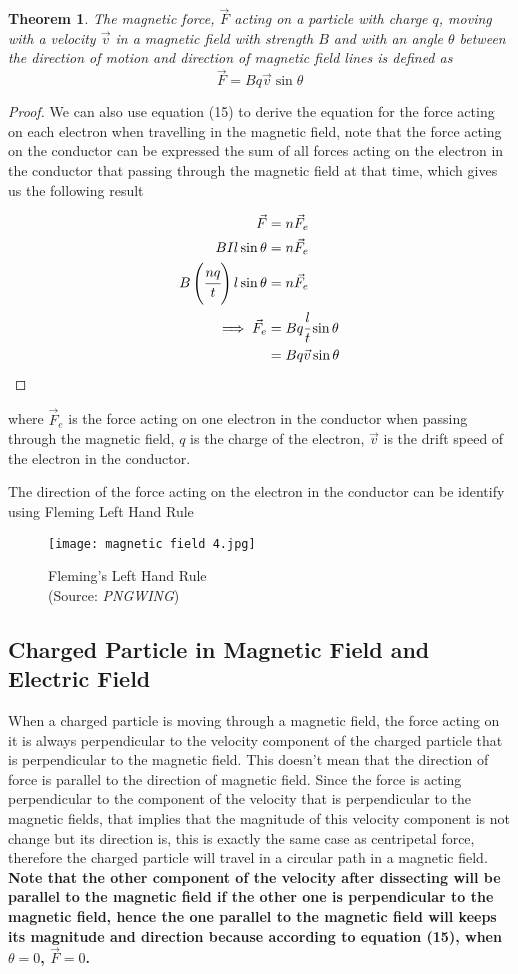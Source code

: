 \documentclass{article}
\newtheorem{theorem}{Theorem}[subsection]
\begin{document}
\begin{theorem}
The magnetic force, $\vec{F}$ acting on a particle with charge $q$, moving with a velocity $\vec{v}$ in a magnetic field with strength $B$ and with an angle $\theta$ between the direction of motion and direction of magnetic field lines is defined as
$$\vec{F}=Bq\vec{v}\sin \theta$$
\end{theorem}
\begin{proof}
We can also use equation (15) to derive the equation for the force acting on each electron when travelling in the magnetic field, note that the force acting on the conductor can be expressed the sum of all forces acting on the electron in the conductor that passing through the magnetic field at that time, which gives us the following result

\begin{align*}
    \vec{F}&=n\vec{F}_e \\ BIl\sin \theta &=n\vec{F}_e \\ B\left(\cfrac{nq}{t}\right)l\sin\theta&=n\vec{F}_e  \\ \implies \vec{F}_e&=Bq\cfrac{l}{t}\sin\theta\\ &=Bq\vec{v}\sin\theta
\end{align*}
\end{proof}
where $\vec{F}_e$ is the force acting on one electron in the conductor when passing through the magnetic field, $q$ is the charge of the electron, $\vec{v}$ is the drift speed of the electron in the conductor.


The direction of the force acting on the electron in the conductor can be identify using Fleming Left Hand Rule

\begin{figure}[H]
    \centering
    \captionsetup{justification=centering,margin=2cm}
    \texttt{[image: magnetic field 4.jpg]}
    \caption*{Fleming's Left Hand Rule \\ (Source: \textit{PNGWING})}
\end{figure}


 \subsection{Charged Particle in Magnetic Field and Electric Field}


When a charged particle is moving through a magnetic field, the force acting on it is always perpendicular to the velocity component of the charged particle that is perpendicular to the magnetic field. This doesn't mean that the direction of force is parallel to the direction of magnetic field. Since the force is acting perpendicular to the component of the velocity that is perpendicular to the magnetic fields, that implies that the magnitude of this velocity component is not change but its direction is, this is exactly the same case as centripetal force, therefore the charged particle will travel in a circular path in a magnetic field. \textbf{Note that the other component of the velocity after dissecting will be parallel to the magnetic field if the other one is perpendicular to the magnetic field, hence the one parallel to the magnetic field will keeps its magnitude and direction because according to equation (15), when $\theta=0$, $\vec{F}=0$.}
\end{document}
